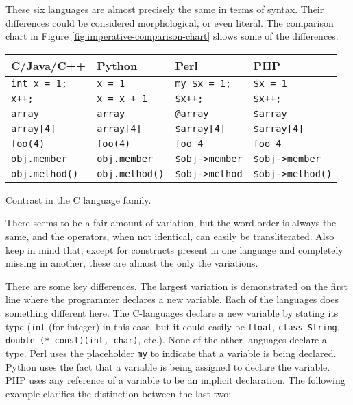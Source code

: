 \documentclass[12pt]{article}
\begin{document}
These six languages are almost precisely the same in terms of syntax.
Their differences could be considered morphological, or even literal.
The comparison chart in Figure \ref{fig:imperative-comparison-chart}
shows some of the differences.

\begin{Figure}
\label{fig:imperative-comparison-chart}
\begin{tabular}{l|l|l|l}
\textbf{C/Java/C++} & \textbf{Python} & \textbf{Perl}     & \textbf{PHP} \\
\hline
\verb+int x = 1;+   & \verb+x = 1+        & \verb+my $x = 1;+   & \verb+$x = 1+     \\
\verb|x++;|         & \verb|x = x + 1|    & \verb|$x++;|        & \verb|$x++;|      \\
\verb+array+		& \verb+array+        & \verb+@array+		& \verb+$array+     \\
\verb+array[4]+		& \verb+array[4]+     & \verb+$array[4]+    & \verb+$array[4]+  \\
\verb+foo(4)+       & \verb+foo(4)+       & \verb+foo 4+        & \verb+foo 4+      \\
\verb+obj.member+   & \verb+obj.member+   & \verb+$obj->member+ & \verb+$obj->member+ \\
\verb+obj.method()+ & \verb+obj.method()+ & \verb+$obj->method+ & \verb+$obj->method()+ \\
\end{tabular}
\caption{Contrast in the C language family.}
\end{Figure}

There seems to be a fair amount of variation, but the word order is
always the same, and the operators, when not identical, can easily be
transliterated.  Also keep in mind that, except for constructs present
in one language and completely missing in another, these are almost the
only the variations.

There are some key differences.  The largest variation is demonstrated
on the first line where the programmer declares a new variable.  Each of
the languages does something different here.  The C-languages declare a
new variable by stating its type (\texttt{int} (for integer) in this
case, but it could easily be \texttt{float}, \texttt{class String},
\texttt{double (* const)(int, char)}, etc.).  None of the other
languages declare a type.  Perl uses the placeholder \texttt{my} to
indicate that a variable is being declared.  Python uses the fact that a
variable is being assigned to declare the variable.  PHP uses any
reference of a variable to be an implicit declaration.  The following
example clarifies the distinction between the last two:
\end{document}
